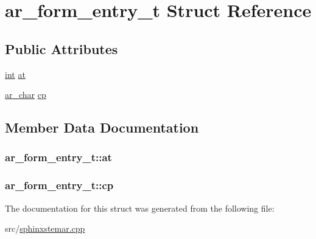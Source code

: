 \hypertarget{structar__form__entry__t}{\section{ar\-\_\-form\-\_\-entry\-\_\-t Struct Reference}
\label{structar__form__entry__t}
}
\subsection*{Public Attributes}
\begin{DoxyCompactItemize}
\item 
\hyperlink{sphinxexpr_8cpp_a4a26e8f9cb8b736e0c4cbf4d16de985e}{int} \hyperlink{structar__form__entry__t_ab9a4622002ec07c2834eac251dddc50b}{at}
\item 
\hyperlink{sphinxstemar_8cpp_a9233a39c6839212116cc51040cc9f962}{ar\-\_\-char} \hyperlink{structar__form__entry__t_a69411f3d1943f7e4bfbadfe2c14dfe7e}{cp}
\end{DoxyCompactItemize}


\subsection{Member Data Documentation}
\hypertarget{structar__form__entry__t_ab9a4622002ec07c2834eac251dddc50b}{
\subsubsection[{at}]{ ar\-\_\-form\-\_\-entry\-\_\-t\-::at}}\label{structar__form__entry__t_ab9a4622002ec07c2834eac251dddc50b}
\hypertarget{structar__form__entry__t_a69411f3d1943f7e4bfbadfe2c14dfe7e}{
\subsubsection[{cp}]{ ar\-\_\-form\-\_\-entry\-\_\-t\-::cp}}\label{structar__form__entry__t_a69411f3d1943f7e4bfbadfe2c14dfe7e}


The documentation for this struct was generated from the following file\-:\begin{DoxyCompactItemize}
\item 
src/\hyperlink{sphinxstemar_8cpp}{sphinxstemar.\-cpp}\end{DoxyCompactItemize}
